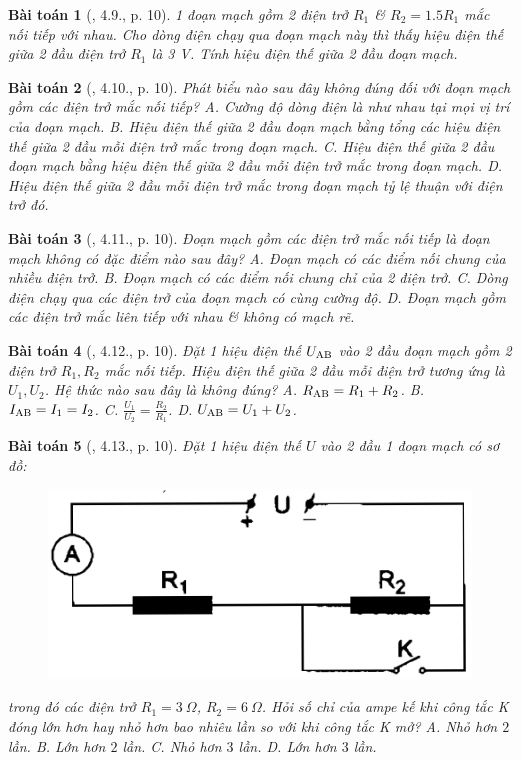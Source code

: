 \documentclass{article}
\newtheorem{baitoan}{Bài toán}
\begin{document}
\begin{baitoan}[\cite{SBT_Vat_Ly_9}, 4.9., p. 10]
	1 đoạn mạch gồm 2 điện trở $R_1$ \& $R_2 = 1.5R_1$ mắc nối tiếp với nhau. Cho dòng điện chạy qua đoạn mạch này thì thấy hiệu điện thế giữa 2 đầu điện trở $R_1$ là \emph{3 V}. Tính hiệu điện thế giữa 2 đầu đoạn mạch.
\end{baitoan}

\begin{baitoan}[\cite{SBT_Vat_Ly_9}, 4.10., p. 10]
	Phát biểu nào sau đây không đúng đối với đoạn mạch gồm các điện trở mắc nối tiếp? {\sf A.} Cường độ dòng điện là như nhau tại mọi vị trí của đoạn mạch. {\sf B.} Hiệu điện thế giữa 2 đầu đoạn mạch bằng tổng các hiệu điện thế giữa 2 đầu mỗi điện trở mắc trong đoạn mạch. {\sf C.} Hiệu điện thế giữa 2 đầu đoạn mạch bằng hiệu điện thế giữa 2 đầu mỗi điện trở mắc trong đoạn mạch. {\sf D.} Hiệu điện thế giữa 2 đầu mỗi điện trở mắc trong đoạn mạch tỷ lệ thuận với điện trở đó.
\end{baitoan}

\begin{baitoan}[\cite{SBT_Vat_Ly_9}, 4.11., p. 10]
	Đoạn mạch gồm các điện trở mắc nối tiếp là đoạn mạch không có đặc điểm nào sau đây? {\sf A.} Đoạn mạch có các điểm nối chung của nhiều điện trở. {\sf B.} Đoạn mạch có các điểm nối chung chỉ của 2 điện trở. {\sf C.} Dòng điện chạy qua các điện trở của đoạn mạch có cùng cường độ. {\sf D.} Đoạn mạch gồm các điện trở mắc liên tiếp với nhau \& không có mạch rẽ.
\end{baitoan}

\begin{baitoan}[\cite{SBT_Vat_Ly_9}, 4.12., p. 10]
	Đặt 1 hiệu điện thế $U_{\rm AB}$ vào 2 đầu đoạn mạch gồm 2 điện trở $R_1,R_2$ mắc nối tiếp. Hiệu điện thế giữa 2 đầu mỗi điện trở tương ứng là $U_1,U_2$. Hệ thức nào sau đây là không đúng? {\sf A.} $R_{\rm AB} = R_1 + R_2$. {\sf B.} $I_{\rm AB} = I_1 = I_2$. {\sf C.} $\frac{U_1}{U_2} = \frac{R_2}{R_1}$. {\sf D.} $U_{\rm AB} = U_1 + U_2$.
\end{baitoan}

\begin{baitoan}[\cite{SBT_Vat_Ly_9}, 4.13., p. 10]
	Đặt 1 hiệu điện thế $U$ vào 2 đầu 1 đoạn mạch có sơ đồ:
	\begin{figure}[H]
		\centering
		\includegraphics[scale=0.25]{SBT_4.3}
	\end{figure}
	\noindent trong đó các điện trở $R_1 = 3\ \Omega$, $R_2 = 6\ \Omega$. Hỏi số chỉ của ampe kế khi công tắc K đóng lớn hơn hay nhỏ hơn bao nhiêu lần so với khi công tắc K mở? {\sf A.} Nhỏ hơn $2$ lần. {\sf B.} Lớn hơn $2$ lần. {\sf C.} Nhỏ hơn $3$ lần. {\sf D.} Lớn hơn $3$ lần.
\end{baitoan}
\end{document}
